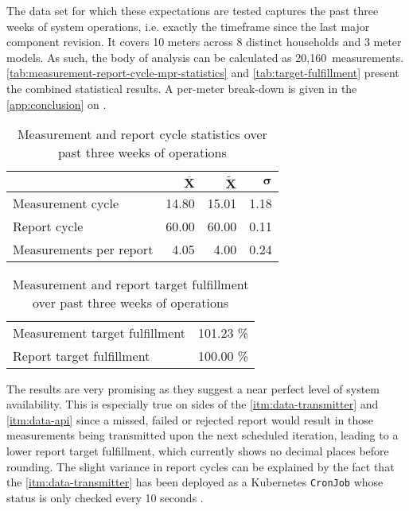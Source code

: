 The data set for which these expectations are tested captures the past three weeks of system operations, i.e. exactly the timeframe since the last major component revision. It covers 10 meters across 8 distinct households and 3 meter models. As such, the body of analysis can be calculated as 20,160~measurements. \autoref{tab:measurement-report-cycle-mpr-statistics} and \autoref{tab:target-fulfillment} present the combined statistical results. A per-meter break-down is given in the \autoref{app:conclusion} on .

\begin{table}[hbt]
	\centering
  	\begin{tabularx}{\textwidth}{|X|r|r|r|}
		\hline
		& ${\overline{\textbf{X}}}$ & $\widetilde{\textbf{X}}$ & $\boldsymbol{\sigma}$ \\
	    	\hline
	    	Measurement cycle 			& 14.80 & 15.01 & 1.18 \\
	    	Report cycle 				& 60.00 & 60.00 & 0.11 \\
	    	Measurements per report 	&  4.05 &  4.00 & 0.24 \\
	    	\hline
	\end{tabularx}
  	\caption{Measurement and report cycle statistics over past three weeks of operations}
  	\label{tab:measurement-report-cycle-mpr-statistics}
\end{table}

\FloatBarrier

\begin{table}[hbt]
	\centering
  	\begin{tabularx}{\textwidth}{|X|r|}
		\hline
	    	Measurement target fulfillment 			& 101.23 \% \\
	    	Report target fulfillment 				& 100.00 \% \\
	    	\hline
	\end{tabularx}
  	\caption{Measurement and report target fulfillment over past three weeks of operations}
  	\label{tab:target-fulfillment}
\end{table}

The results are very promising as they suggest a near perfect level of system availability. This is especially true on sides of the \ref{itm:data-transmitter} and \ref{itm:data-api} since a missed, failed or rejected report would result in those measurements being transmitted upon the next scheduled iteration, leading to a lower report target fulfillment, which currently shows no decimal places before rounding. The slight variance in report cycles can be explained by the fact that the \ref{itm:data-transmitter} has been deployed as a Kubernetes \texttt{CronJob} whose status is only checked every 10 seconds \cite{kubernetesCronjob}. 

